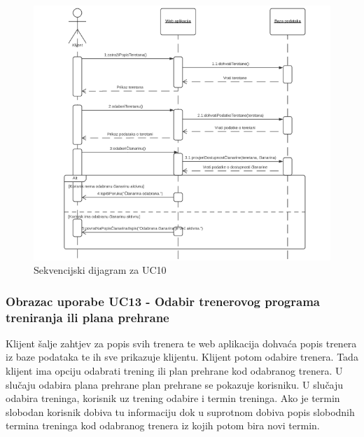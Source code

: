                     \begin{figure}[H]
			            \includegraphics[scale=0.9]{slike/UC10.PNG} %
			            \centering
			            \caption{Sekvencijski dijagram za UC10}
			            \label{fig:promjene}
		            \end{figure}
                    
                    
                    \subsubsection{Obrazac uporabe UC13 - Odabir trenerovog programa treniranja ili plana prehrane}
					\textit{}Klijent šalje zahtjev za popis svih trenera te web aplikacija dohvaća popis trenera
                    iz baze podataka te ih sve prikazuje klijentu. Klijent potom odabire trenera. Tada
                    klijent ima opciju odabrati trening ili plan prehrane kod odabranog trenera. U slučaju
                    odabira plana prehrane plan prehrane se pokazuje korisniku. U slučaju odabira treninga,
                    korisnik uz trening odabire i termin treninga. Ako je termin slobodan korisnik dobiva tu
                    informaciju dok u suprotnom dobiva popis slobodnih termina treninga kod odabranog trenera
                    iz kojih potom bira novi termin.\\
                    
